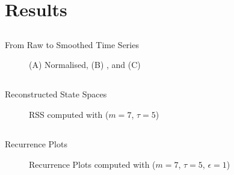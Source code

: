 


\section{Results}

\subsection{}
{

\begin{frame}{From Raw to Smoothed Time Series}
    \begin{figure}
	\caption{(A) Normalised, (B) , and (C)  } 
   \end{figure}
	
\end{frame}
}


\subsection{}
{

\begin{frame}{Reconstructed State Spaces}
    \begin{figure}
	\caption{RSS computed with ($m=7$, $\tau=5$)} 
   \end{figure}
	
\end{frame}
}


\subsection{}
{

\begin{frame}{Recurrence Plots}
    \begin{figure}
	\caption{Recurrence Plots computed with ($m=7$, $\tau=5$, $\epsilon=1$)} 
   \end{figure}
	
\end{frame}
}


